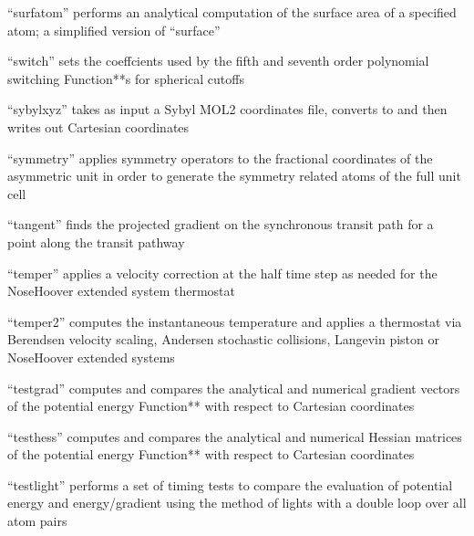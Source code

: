 \documentclass[letterpaper,11pt,english]{sphinxmanual}
\begin{document}

“surfatom” performs an analytical computation of the surface area of a specified atom; a simplified version of “surface”


“switch” sets the coeffcients used by the fifth and seventh order polynomial switching Function**s for spherical cutoffs


“sybylxyz” takes as input a Sybyl MOL2 coordinates file, converts to and then writes out Cartesian coordinates


“symmetry” applies symmetry operators to the fractional coordinates of the asymmetric unit in order to generate the symmetry related atoms of the full unit cell


“tangent” finds the projected gradient on the synchronous transit path for a point along the transit pathway


“temper” applies a velocity correction at the half time step as needed for the Nose\sphinxhyphen{}Hoover extended system thermostat


“temper2” computes the instantaneous temperature and applies a thermostat via Berendsen velocity scaling, Andersen stochastic collisions, Langevin piston or Nose\sphinxhyphen{}Hoover extended systems


“testgrad” computes and compares the analytical and numerical gradient vectors of the potential energy Function** with respect to Cartesian coordinates


“testhess” computes and compares the analytical and numerical Hessian matrices of the potential energy Function** with respect to Cartesian coordinates


“testlight” performs a set of timing tests to compare the evaluation of potential energy and energy/gradient using the method of lights with a double loop over all atom pairs
\end{document}
